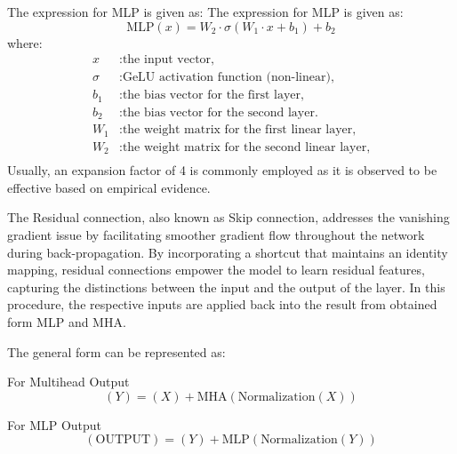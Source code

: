 \noindent The expression for MLP is given as:
\noindent The expression for MLP is given as:
\begin{equation}
    \text{MLP}(x) = W_2 \cdot \sigma(W_1 \cdot x + b_1) + b_2 \label{eq:mlp}
\end{equation}
where:
\begin{align*}
    x      & : \text{the input vector,}                              \\
    \sigma & : \text{GeLU activation function (non-linear),}         \\
    b_1    & : \text{the bias vector for the first layer,}           \\
    b_2    & : \text{the bias vector for the second layer.}          \\
    W_1    & : \text{the weight matrix for the first linear layer,}  \\
    W_2    & : \text{the weight matrix for the second linear layer,} \\
\end{align*}
Usually, an expansion factor of 4 is commonly employed as it is observed to be effective based on empirical evidence.

\noindent The Residual connection, also known as Skip connection, addresses the vanishing gradient issue by facilitating smoother gradient flow throughout the network during back-propagation. By incorporating a shortcut that maintains an identity mapping, residual connections empower the model to learn residual features, capturing the distinctions between the input and the output of the layer. In this procedure, the respective inputs are applied back into the result from obtained form MLP and MHA.

\noindent The general form can be represented as:

\noindent For Multihead Output
\begin{equation}
    (Y) = (X) + \text{MHA} (\text{Normalization} (X)) \label{eq:multihead_output}
\end{equation}

\noindent For MLP Output
\begin{equation}
    (\text{OUTPUT}) = (Y) + \text{MLP} (\text{Normalization} (Y)) \label{eq:mlp_output}
\end{equation}

